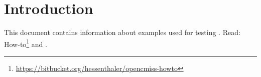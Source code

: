 %
\section{Introduction}
%
This document contains information about examples used for testing \iron.
Read: How-to\footnote{\url{https://bitbucket.org/hessenthaler/opencmiss-howto}}
and \cite{OpenCMISS2011}.
%
